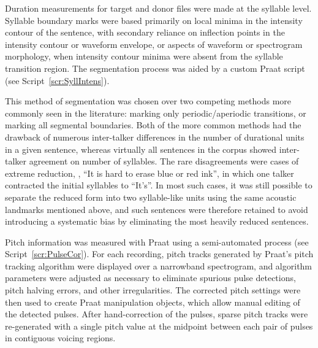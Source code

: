 
Duration measurements for target and donor files were made at the syllable level.  Syllable boundary marks were based primarily on local minima in the intensity contour of the sentence, with secondary reliance on inflection points in the intensity contour or waveform envelope, or aspects of waveform or spectrogram morphology, when intensity contour minima were absent from the syllable transition region.  The segmentation process was aided by a custom Praat script (see Script~\ref{scr:SyllIntens}).\footnotemark{}


This method of segmentation was chosen over two competing methods more commonly seen in the literature: marking only periodic/aperiodic transitions, or marking all segmental boundaries.  Both of the more common methods had the drawback of numerous inter-talker differences in the number of durational units in a given sentence, whereas virtually all sentences in the corpus showed inter-talker agreement on number of syllables.  The rare disagreements were cases of extreme reduction, \eg, “It is hard to erase blue or red ink”, in which one talker contracted the initial syllables to “It’s”.  In most such cases, it was still possible to separate the reduced form into two syllable-like units using the same acoustic landmarks mentioned above, and such sentences were therefore retained to avoid introducing a systematic bias by eliminating the most heavily reduced sentences.

Pitch information was measured with Praat using a semi-automated process (see Script~\ref{scr:PulseCor}).  For each recording, pitch tracks generated by Praat’s pitch tracking algorithm were displayed over a narrowband spectrogram, and algorithm parameters were adjusted as necessary to eliminate spurious pulse detections, pitch halving errors, and other irregularities.  The corrected pitch settings were then used to create Praat manipulation objects, which allow manual editing of the detected pulses.  After hand-correction of the pulses, sparse pitch tracks were re-generated with a single pitch value at the midpoint between each pair of pulses in contiguous voicing regions.

